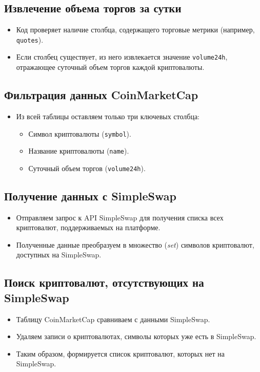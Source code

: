 \documentclass[12pt]{article}
\theoremstyle{indented}
\theoremstyle{definition}
\theoremstyle{remark}
\begin{document}
\subsection{Извлечение объема торгов за сутки}
\begin{itemize}
    \item Код проверяет наличие столбца, содержащего торговые метрики (например, \texttt{quotes}).
    \item Если столбец существует, из него извлекается значение \texttt{volume24h}, отражающее суточный объем торгов каждой криптовалюты.
\end{itemize}

\subsection{Фильтрация данных CoinMarketCap}
\begin{itemize}
    \item Из всей таблицы оставляем только три ключевых столбца:
    \begin{itemize}
        \item Символ криптовалюты (\texttt{symbol}).
        \item Название криптовалюты (\texttt{name}).
        \item Суточный объем торгов (\texttt{volume24h}).
    \end{itemize}
\end{itemize}

\subsection{Получение данных с SimpleSwap}
\begin{itemize}
    \item Отправляем запрос к API SimpleSwap для получения списка всех криптовалют, поддерживаемых на платформе.
    \item Полученные данные преобразуем в множество (\textit{set}) символов криптовалют, доступных на SimpleSwap.
\end{itemize}

\subsection{Поиск криптовалют, отсутствующих на SimpleSwap}
\begin{itemize}
    \item Таблицу CoinMarketCap сравниваем с данными SimpleSwap.
    \item Удаляем записи о криптовалютах, символы которых уже есть в SimpleSwap.
    \item Таким образом, формируется список криптовалют, которых нет на SimpleSwap.
\end{itemize}
\end{document}
